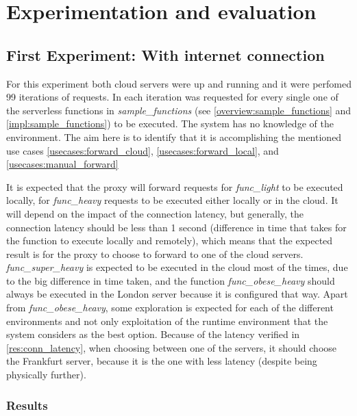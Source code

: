 \section{Experimentation and evaluation}

\subsection{First Experiment: With internet connection}
For this experiment both cloud servers were up and running and it were perfomed
99 iterations of requests. In each iteration was requested for every single one
of the serverless functions in \textit{sample\_functions} (see
\ref{overview:sample_functions} and \ref{impl:sample_functions}) to be executed.
The system has no knowledge of the environment. The aim here is to identify
that it is accomplishing the mentioned use cases \ref{usecases:forward_cloud},
\ref{usecases:forward_local}, and \ref{usecases:manual_forward}


It is expected that the proxy will forward requests for \textit{func\_light} to be
executed locally, for \textit{func\_heavy} requests to be executed either locally
or in the cloud. It will depend on the impact of the connection latency, but
generally, the connection latency should be less than 1 second (difference in time
that takes for the function to execute locally and remotely), which means that the expected result is for the proxy to choose to forward to one of the cloud servers.
\textit{func\_super\_heavy} is expected to be executed in the cloud most of the
times, due to the big difference in time taken, and the function
\textit{func\_obese\_heavy} should always be executed in the London server because
it is configured that way. Apart from \textit{func\_obese\_heavy}, some
exploration is expected for each of the different environments and not only
exploitation of the runtime environment that the system considers as the best
option. Because of the latency verified in \ref{res:conn_latency}, when choosing
between one of the servers, it should choose the Frankfurt server, because it is
the one with less latency (despite being physically further).

\subsubsection{Results}

